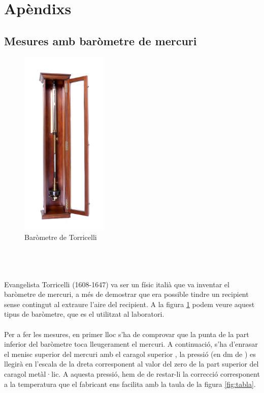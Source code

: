 \documentclass{article}
\begin{document}
\newpage
\section{Apèndixs}
    \subsection{Mesures amb baròmetre de mercuri}\label{appendix:baròmetre}
        \begin{figure}
            \centering
            \includegraphics[width=.45\textwidth,height=9cm]{fotos/torricelli.png}
            \caption{Baròmetre de Torricelli}
            \label{fig:baròmetre}
        \end{figure}
        
        \hfill{}\\\hfill{}\\\hfill{}\\
        Evangelista Torricelli (1608-1647) va ser un físic italià que va inventar el baròmetre de mercuri, a més de demostrar que era possible tindre un recipient sense contingut al extraure l'aire del recipient. A la figura \ref{fig:baròmetre} podem veure aquest tipus de baròmetre, que es el utilitzat al laboratori.\\ \\
        Per a fer les mesures, en primer lloc s’ha de comprovar que la punta de la part inferior del baròmetre toca lleugerament el mercuri. A continuació, s’ha d’enrasar el menisc superior del mercuri amb el caragol superior , la pressió (en $\si{\deci\meter}$ de ) es llegirà en l’escala de la dreta corresponent al valor del zero de la part superior del caragol metàl·lic. A aquesta pressió, hem de de restar-li la correcció corresponent a la temperatura que el fabricant ens facilita amb la taula de la figura \ref{fig:tabla}.\\ 
\end{document}
